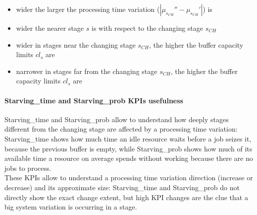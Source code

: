 \begin{itemize}
\item wider the larger the processing time variation ($|\mu_{s_{CH}}''-\mu_{s_{CH}}'|$) is
\item wider the nearer stage $s$ is with respect to the changing stage $s_{CH}$
\item wider in stages near the changing stage $s_{CH}$, the higher the buffer capacity limits $cl_s$ are 
\item narrower in stages far from the changing stage $s_{CH}$, the higher the buffer capacity limits $cl_s$ are
\end{itemize}
\paragraph{Starving\_time and Starving\_prob KPIs usefulness}
Starving\_time and Starving\_prob allow to understand how deeply stages different from the changing stage are affected by a processing time variation: Starving\_time shows how much time an idle resource waits before a job seizes it, because the previous buffer is empty, while Starving\_prob shows how much of its available time a resource on average spends without working because there are no jobs to process.\\
These KPIs allow to understand a processing time variation direction (increase or decrease) and its approximate size: Starving\_time and Starving\_prob do not directly show the exact change extent, but high KPI changes are the clue that a big system variation is occurring in a stage.
